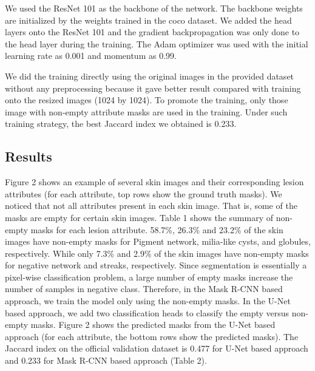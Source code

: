 \documentclass{article}
\begin{document}
We used the ResNet 101 as the backbone of the network. The backbone weights are initialized by the weights trained in the coco dataset. We added the head layers onto the ResNet 101 and the gradient backpropagation was only done to the head layer during the training. The Adam optimizer was used with the initial learning rate as 0.001 and momentum as 0.99.

We did the training directly using the original images in the provided dataset without any preprocessing because it gave better result compared with training onto the resized images (1024 by 1024). To promote the training, only those image with non-empty attribute masks are used in the training. Under such training strategy, the best Jaccard index we obtained is 0.233.

\subsection{Results}
Figure 2 shows an example of several skin images and their corresponding lesion attributes (for each attribute, top rows show the ground truth masks).  We noticed that not all attributes present in each skin image. That is, some of the masks are empty for certain skin images. Table 1 shows the summary of non-empty masks for each lesion attribute. 58.7\%, 26.3\% and 23.2\% of the skin images have non-empty masks for Pigment network, milia-like cysts, and globules, respectively.  While only 7.3\% and 2.9\% of the skin images have non-empty masks for negative network and streaks, respectively. Since segmentation is essentially a pixel-wise classification problem, a large number of empty masks increase the number of samples in negative class. Therefore, in the Mask R-CNN based approach, we train the model only using the non-empty masks. In the U-Net based approach, we add two classification heads to classify the empty versus non-empty masks. Figure 2 shows the predicted masks from the U-Net based approach (for each attribute, the bottom rows show the predicted masks). The Jaccard index on the official validation dataset is 0.477 for U-Net based approach and 0.233 for Mask R-CNN based approach (Table 2). 


\end{document}
